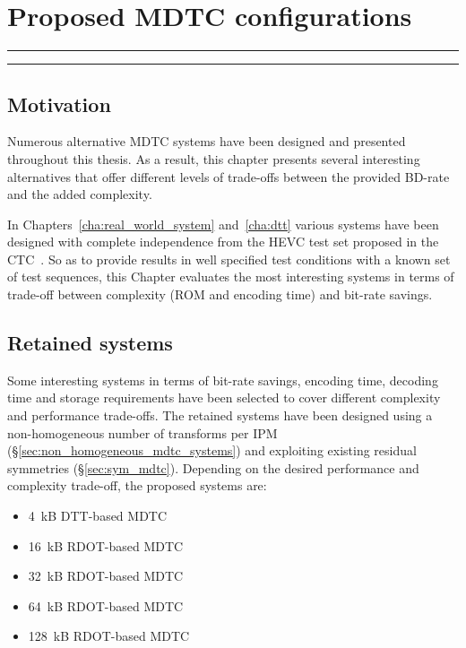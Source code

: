 \documentclass[11pt,a4paper,openright,twoside]{book}
\providecommand{\chaptertoc}{
	\startcontents[chapters]
	\hrule
	\vspace{1em}
	\printcontents[chapters]{}{1}{{\sf\large\bfseries Contents}}
	\hrule
}
\numberwithin{equation}{section} %
\numberwithin{figure}{section} %
\numberwithin{table}{section} %
\begin{document}
\chapter{Proposed \acs{MDTC} configurations}
\label{cha:proposed_mdtc_configurations}
\chaptertoc

\section{Motivation}
\label{sec:summary_motivation}

Numerous alternative \acs{MDTC} systems have been designed and presented
throughout this thesis.
As a result, this chapter presents several interesting alternatives that offer
different levels of trade-offs between the provided \acs{BD}-rate and the
added complexity.

In Chapters~\ref{cha:real_world_system} and~\ref{cha:dtt} various systems have
been designed with complete independence from the \ac{HEVC} test set proposed
in the \ac{CTC}~\cite{bossen-12-common-test-conditions}.
So as to provide results in well specified test conditions with a known set of
test sequences, this Chapter evaluates the most interesting systems in terms
of trade-off between complexity (\acs{ROM} and encoding time) and bit-rate
savings.

\section{Retained systems}
\label{sec:retained_systems}

Some interesting systems in terms of bit-rate savings, encoding time, decoding
time and storage requirements have been selected to cover different complexity
and performance trade-offs.
The retained systems have been designed using a non-homogeneous number of
transforms per \ac{IPM} (\S\ref{sec:non_homogeneous_mdtc_systems}) and
exploiting existing residual symmetries (\S\ref{sec:sym_mdtc}).
Depending on the desired performance and complexity trade-off, the proposed
systems are:
\begin{itemize}
	\item \SI{4}{\kilo B} \acs{DTT}-based \acs{MDTC}
	\item \SI{16}{\kilo B} \acs{RDOT}-based \acs{MDTC}
	\item \SI{32}{\kilo B} \acs{RDOT}-based \acs{MDTC}
	\item \SI{64}{\kilo B} \acs{RDOT}-based \acs{MDTC}
	\item \SI{128}{\kilo B} \acs{RDOT}-based \acs{MDTC}
\end{itemize}
\end{document}
